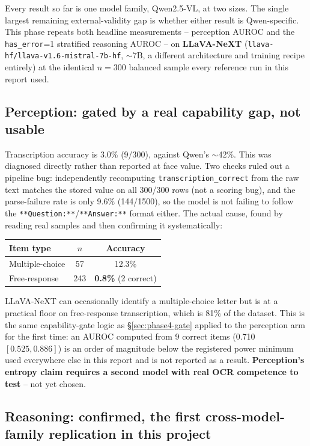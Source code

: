\documentclass[11pt]{article}
\begin{document}
Every result so far is one model family, Qwen2.5-VL, at two sizes. The
single largest remaining external-validity gap is whether either result is
Qwen-specific. This phase repeats both headline measurements --
perception AUROC and the \texttt{has\_error}=1 stratified reasoning AUROC
-- on \textbf{LLaVA-NeXT} (\texttt{llava-hf/llava-v1.6-mistral-7b-hf},
$\sim$7B, a different architecture and training recipe entirely) at the
identical $n=300$ balanced sample every reference run in this report used.

\subsection{Perception: gated by a real capability gap, not usable}
\label{sec:phase5-perception-gate}

Transcription accuracy is 3.0\% (9/300), against Qwen's $\sim$42\%. This
was diagnosed directly rather than reported at face value. Two checks
ruled out a pipeline bug: independently recomputing
\texttt{transcription\_correct} from the raw text matches the stored value
on all 300/300 rows (not a scoring bug), and the parse-failure rate is
only 9.6\% (144/1500), so the model is not failing to follow the
\texttt{**Question:**}/\texttt{**Answer:**} format either. The actual
cause, found by reading real samples and then confirming it systematically:

\begin{center}
\begin{tabular}{lcc}
\toprule
Item type & $n$ & Accuracy \\
\midrule
Multiple-choice & 57 & 12.3\% \\
Free-response & 243 & \textbf{0.8\%} (2 correct) \\
\bottomrule
\end{tabular}
\end{center}

LLaVA-NeXT can occasionally identify a multiple-choice letter but is at a
practical floor on free-response transcription, which is 81\% of the
dataset. This is the same capability-gate logic as \S\ref{sec:phase4-gate}
applied to the perception arm for the first time: an AUROC computed from 9
correct items (0.710 $[0.525, 0.886]$) is an order of magnitude below the
registered power minimum used everywhere else in this report and is not
reported as a result. \textbf{Perception's entropy claim requires a second
model with real OCR competence to test} -- not yet chosen.

\subsection{Reasoning: confirmed, the first cross-model-family replication in this project}
\label{sec:phase5-reasoning}
\end{document}
